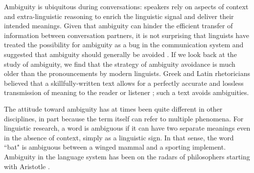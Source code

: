 \documentclass[11pt,a4paper]{article}
\begin{document}



Ambiguity is ubiquitous during conversations: speakers rely on aspects of context and extra-linguistic reasoning to enrich the linguistic signal and deliver their intended meanings. Given that ambiguity can hinder the efficient transfer of information between conversation partners, it is not surprising that linguists have treated the possibility for ambiguity as a bug in the communication system \cite{chomsky2002minimalism} and suggested that ambiguity should generally be avoided \cite{grice1975}. If we look back at the study of ambiguity, we find that the strategy of ambiguity avoidance is much older than the pronouncements by modern linguists. Greek and Latin rhetoricians believed that a skillfully-written text allows for a perfectly accurate and lossless transmission of meaning to the reader or listener \cite{ossarichardson2019}; such a text avoids ambiguities.

The attitude toward ambiguity has at times been quite different in other disciplines, in part because the term itself can refer to multiple phenomena. For linguistic research, a word is ambiguous if it can have two separate meanings even in the absence of context, simply as a linguistic sign. In that sense, the word ``bat" is ambiguous between a winged mammal and a sporting implement. Ambiguity in the language system has been on the radars of philosophers starting with Aristotle \cite{sennet2016ambiguity}. 
\end{document}
